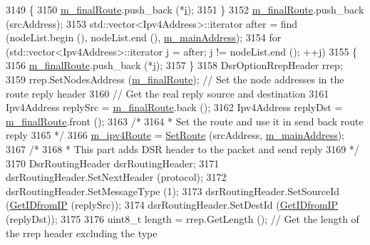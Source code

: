 \begin{DoxyCode}
3149         \{
3150           \hyperlink{classns3_1_1dsr_1_1DsrRouting_afb085eaa8fcab547a83f683ef5aef41a}{m\_finalRoute}.push\_back (*\hyperlink{bernuolliDistribution_8m_a6f6ccfcf58b31cb6412107d9d5281426}{i});
3151         \}
3152       \hyperlink{classns3_1_1dsr_1_1DsrRouting_afb085eaa8fcab547a83f683ef5aef41a}{m\_finalRoute}.push\_back (srcAddress);
3153       std::vector<Ipv4Address>::iterator after = find (nodeList.begin (), nodeList.end (), 
      \hyperlink{classns3_1_1dsr_1_1DsrRouting_a73182b5edee2d8460f28855e058fc9a0}{m\_mainAddress});
3154       \textcolor{keywordflow}{for} (std::vector<Ipv4Address>::iterator j = after; j != nodeList.end (); ++j)
3155         \{
3156           \hyperlink{classns3_1_1dsr_1_1DsrRouting_afb085eaa8fcab547a83f683ef5aef41a}{m\_finalRoute}.push\_back (*j);
3157         \}
3158       DsrOptionRrepHeader rrep;
3159       rrep.SetNodesAddress (\hyperlink{classns3_1_1dsr_1_1DsrRouting_afb085eaa8fcab547a83f683ef5aef41a}{m\_finalRoute});           \textcolor{comment}{// Set the node addresses in the route
       reply header}
3160       \textcolor{comment}{// Get the real reply source and destination}
3161       Ipv4Address replySrc = \hyperlink{classns3_1_1dsr_1_1DsrRouting_afb085eaa8fcab547a83f683ef5aef41a}{m\_finalRoute}.back ();
3162       Ipv4Address replyDst = \hyperlink{classns3_1_1dsr_1_1DsrRouting_afb085eaa8fcab547a83f683ef5aef41a}{m\_finalRoute}.front ();
3163       \textcolor{comment}{/*}
3164 \textcolor{comment}{       * Set the route and use it in send back route reply}
3165 \textcolor{comment}{       */}
3166       \hyperlink{classns3_1_1dsr_1_1DsrRouting_ab4c16d56044159989e52ad33c0afed2b}{m\_ipv4Route} = \hyperlink{classns3_1_1dsr_1_1DsrRouting_a8a726fb52558a1a8172a5bd5b8cdb072}{SetRoute} (srcAddress, \hyperlink{classns3_1_1dsr_1_1DsrRouting_a73182b5edee2d8460f28855e058fc9a0}{m\_mainAddress});
3167       \textcolor{comment}{/*}
3168 \textcolor{comment}{       * This part adds DSR header to the packet and send reply}
3169 \textcolor{comment}{       */}
3170       DsrRoutingHeader dsrRoutingHeader;
3171       dsrRoutingHeader.SetNextHeader (protocol);
3172       dsrRoutingHeader.SetMessageType (1);
3173       dsrRoutingHeader.SetSourceId (\hyperlink{classns3_1_1dsr_1_1DsrRouting_a4593e50d5f36e9b9b013fe0422067c44}{GetIDfromIP} (replySrc));
3174       dsrRoutingHeader.SetDestId (\hyperlink{classns3_1_1dsr_1_1DsrRouting_a4593e50d5f36e9b9b013fe0422067c44}{GetIDfromIP} (replyDst));
3175 
3176       uint8\_t length = rrep.GetLength ();        \textcolor{comment}{// Get the length of the rrep header excluding the type
}
\end{DoxyCode}
